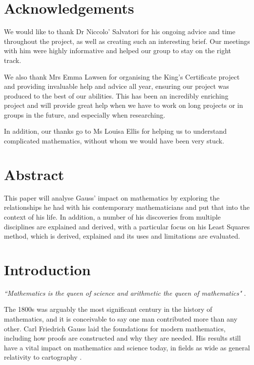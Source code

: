 \documentclass{article}
\begin{document}



\section*{Acknowledgements}
We would like to thank Dr Niccolo' Salvatori for his ongoing advice and time throughout the project, as well as creating such an interesting brief. Our meetings with him were highly informative and helped our group to stay on the right track.

We also thank Mrs Emma Lawsen for organising the King's Certificate project and providing invaluable help and advice all year, ensuring our project was produced to the best of our abilities. This has been an incredibly enriching project and will provide great help when we have to work on long projects or in groups in the future, and especially when researching.

In addition, our thanks go to Ms Louisa Ellis for helping us to understand complicated mathematics, without whom we would have been very stuck.

\section*{Abstract}
This paper will analyse Gauss' impact on mathematics by exploring the relationships he had with his contemporary mathematicians and put that into the context of his life. In addition, a number of his discoveries from multiple disciplines are explained and derived, with a particular focus on his Least Squares method, which is derived, explained and its uses and limitations are evaluated.



\newpage
\tableofcontents

\newpage
\section{Introduction}
\begin{center}
    \textit{``Mathematics is the queen of science and arithmetic the queen of mathematics"}
    .
\end{center}
The 1800s was arguably the most significant century in the history of mathematics, and it is conceivable to say one man contributed more than any other. Carl Friedrich Gauss laid the foundations for modern mathematics, including how proofs are constructed and why they are needed. His results still have a vital impact on mathematics and science today, in fields as wide as general relativity \cite{radioscience} to cartography \cite{cartography}.
\end{document}
